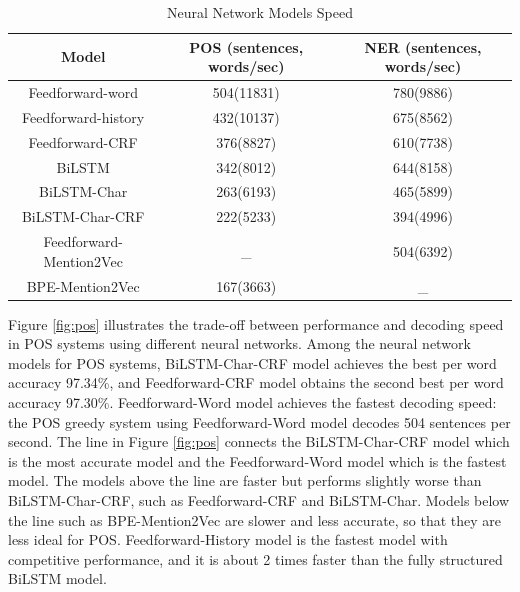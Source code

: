 \documentclass{sfuthesis}
\begin{document}
\begin{table}[]
\centering
\caption{Neural Network Models Speed}
\label{table:my-label2}
\begin{tabular}{|c|c|c|}
\hline
Model       & POS  (sentences, words/sec)  & NER  (sentences, words/sec)      \\ \hline
Feedforward-word    & 504(11831)     & 780(9886)    \\ \hline
Feedforward-history & 432(10137)     & 675(8562)     \\ \hline
Feedforward-CRF     & 376(8827)     & 610(7738)     \\ \hline
BiLSTM             & 342(8012)     & 644(8158)       \\ \hline
BiLSTM-Char        & 263(6193)  & 465(5899)             \\ \hline
BiLSTM-Char-CRF    & 222(5233)  & 394(4996)         \\ \hline
Feedforward-Mention2Vec         & _      & 504(6392)              \\ \hline
BPE-Mention2Vec     & 167(3663)  &  _               \\ \hline   
\end{tabular}
\end{table}

Figure \ref{fig:pos} illustrates the trade-off between performance and decoding speed in POS systems using different neural networks. Among the neural network models for POS systems, BiLSTM-Char-CRF model achieves the best per word accuracy 97.34\%, and Feedforward-CRF model obtains the second best per word accuracy 97.30\%. Feedforward-Word model achieves the fastest decoding speed: the POS greedy system using Feedforward-Word model decodes 504 sentences per second. The line in Figure \ref{fig:pos} connects the BiLSTM-Char-CRF model which is the most accurate model and the Feedforward-Word model which is the fastest model. The models above the line are faster but performs slightly worse than BiLSTM-Char-CRF, such as Feedforward-CRF and BiLSTM-Char. Models below the line such as BPE-Mention2Vec are slower and less accurate, so that they are less ideal for POS. Feedforward-History model is the fastest model with competitive performance, and it is about 2 times faster than the fully structured BiLSTM model.
\end{document}
